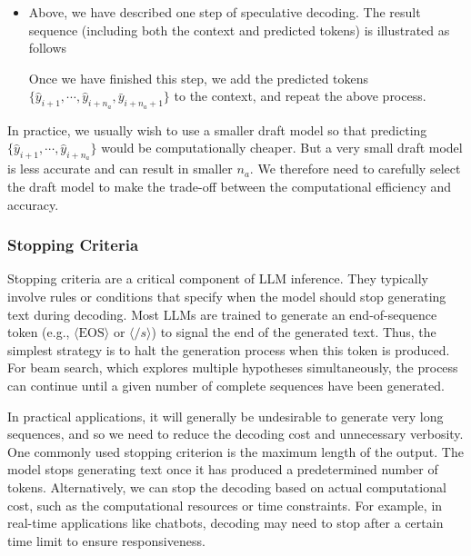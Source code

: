 \begin{itemize}
\begin{eqnarray}
    \bar{y}_{i+n_a+1} & = & \argmax_{y_{i+n_a+1}} \mathrm{Pr}_p(y_{i+n_a+1}|\mathbf{x},\mathbf{y}_{\le i},\hat{y}_{i+1}\cdots\hat{y}_{i+n_a}).
    \end{eqnarray}
\item Above, we have described one step of speculative decoding. The result sequence (including both the context and predicted tokens) is illustrated as follows
\begin{center}

\end{center}
    Once we have finished this step, we add the predicted tokens $\{\hat{y}_{i+1},\cdots,\hat{y}_{i+n_a},\bar{y}_{i+n_a+1} \}$ to the context, and repeat the above process.
\end{itemize}
\vspace{0.5em}

In practice, we usually wish to use a smaller draft model so that predicting $\{\hat{y}_{i+1},\cdots,\hat{y}_{i+n_a}\}$ would be computationally cheaper. But a very small draft model is less accurate and can result in smaller $n_a$. We therefore need to carefully select the draft model to make the trade-off between the computational efficiency and accuracy.

\subsubsection{Stopping Criteria}

Stopping criteria are a critical component of LLM inference. They typically involve rules or conditions that specify when the model should stop generating text during decoding. Most LLMs are trained to generate an end-of-sequence token (e.g., $\langle \mathrm{EOS} \rangle$ or $\langle /s \rangle$) to signal the end of the generated text. Thus, the simplest strategy is to halt the generation process when this token is produced. For beam search, which explores multiple hypotheses simultaneously, the process can continue until a given number of complete sequences have been generated.

In practical applications, it will generally be undesirable to generate very long sequences, and so we need to reduce the decoding cost and unnecessary verbosity. One commonly used stopping criterion is the maximum length of the output. The model stops generating text once it has produced a predetermined number of tokens. Alternatively, we can stop the decoding based on actual computational cost, such as the computational resources or time constraints. For example, in real-time applications like chatbots, decoding may need to stop after a certain time limit to ensure responsiveness.

